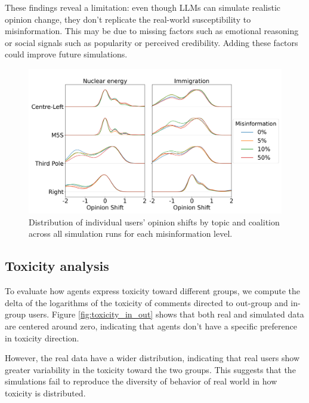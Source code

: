 These findings reveal a limitation: even though LLMs can simulate realistic opinion change, they don't replicate the real-world susceptibility to misinformation.
This may be due to missing factors such as emotional reasoning or social signals such as popularity or perceived credibility.
Adding these factors could improve future simulations.


\begin{figure}[h]
    \centering
    \includegraphics[width=1\linewidth]{Images/Misinformation/score_llm_RandomRecSys_small.png}
    \caption{Distribution of individual users’ opinion shifts by topic and coalition across all simulation runs for each misinformation level.}
    \label{fig:misinfo_opinion_shift}
\end{figure}


\subsection{Toxicity analysis}

To evaluate how agents express toxicity toward different groups, we compute the delta of the logarithms of the toxicity of comments directed to out-group and in-group users.
Figure \ref{fig:toxicity_in_out} shows that both real and simulated data are centered around zero, indicating that agents don't have a specific preference in toxicity direction.

However, the real data have a wider distribution, indicating that real users show greater variability in the toxicity toward the two groups.
This suggests that the simulations fail to reproduce the diversity of behavior of real world  in how toxicity is distributed.



